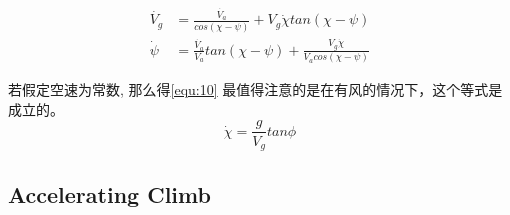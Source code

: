 \documentclass[UTF8,a4paper,10pt,nocolorlinks]{ctexart}
\begin{document}
      \begin{equation}
        \begin{split}
          \dot{V_{g}} &= \frac{\dot{V_{a}}}{cos (\chi - \psi)} + V_{g} \dot{\chi} tan(\chi - \psi) \\
          \dot{\psi} &= \frac{\dot{V_{a}}}{V_{a}} tan (\chi - \psi) + \frac{V_{g} \dot{\chi}}{V_{a}cos(\chi - \psi)}
        \end{split}
    \end{equation}
    \par 若假定空速为常数, 那么得\ref{equ:10} 最值得注意的是在有风的情况下，这个等式是成立的。
    \begin{equation}
        \dot{\chi} = \frac{g}{V_{g}} tan \phi 
        \label{equ:10}
    \end{equation}
    \subsection{Accelerating Climb}
\end{document}
